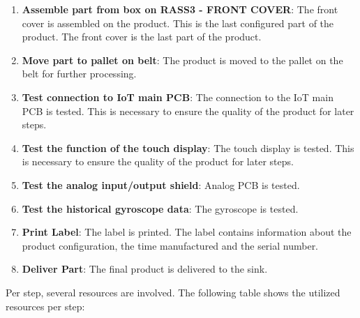 \begin{enumerate}
    \item \textbf{Assemble part from box on RASS3 - FRONT COVER}: The front cover is assembled on the product. This is the last configured part of the product. The front cover is the last part of the product.
    \item \textbf{Move part to pallet on belt}: The product is moved to the pallet on the belt for further processing.
    \item \textbf{Test connection to IoT main PCB}: The connection to the IoT main PCB is tested. This is necessary to ensure the quality of the product for later steps.
    \item \textbf{Test the function of the touch display}: The touch display is tested. This is necessary to ensure the quality of the product for later steps.
    \item \textbf{Test the analog input/output shield}: Analog PCB is tested.
    \item \textbf{Test the historical gyroscope data}: The gyroscope is tested.
    \item \textbf{Print Label}: The label is printed. The label contains information about the product configuration, the time manufactured and the serial number.
    \item \textbf{Deliver Part}: The final product is delivered to the sink.
\end{enumerate}

Per step, several resources are involved. The following table shows the utilized resources per step:

